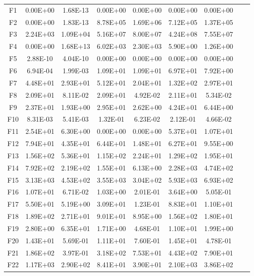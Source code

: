 \begin{table*}[htbp]
\begin{tabular}{|c|cc|cc|cc|cc|}
    \cline{1-7}
    F1    & 0.00E+00 & 1.68E-13 & 0.00E+00 & 0.00E+00 & 0.00E+00 & 0.00E+00 \\
    F2    & 0.00E+00 & 1.83E-13 & 8.78E+05 & 1.69E+06 & 7.12E+05 & 1.37E+05 \\
    F3    & 2.24E+03 & 1.09E+04 & 5.16E+07 & 8.00E+07 & 4.24E+08 & 7.55E+07 \\
    F4    & 0.00E+00 & 1.68E+13 & 6.02E+03 & 2.30E+03 & 5.90E+00 & 1.26E+00 \\
    F5    & 2.88E-10 & 4.04E-10 & 0.00E+00 & 0.00E+00 & 0.00E+00 & 0.00E+00 \\
    \cline{1-7}
    F6    & 6.94E-04 & 1.99E-03 & 1.09E+01 & 1.09E+01 & 6.97E+01 & 7.92E+00 \\
    F7    & 4.48E+01 & 2.93E+01 & 5.12E+01 & 2.04E+01 & 1.32E+02 & 2.97E+01 \\
    F8    & 2.09E+01 & 8.11E-02 & 2.09E+01 & 4.92E-02 & 2.11E+01 & 5.34E-02 \\
    F9    & 2.37E+01 & 1.93E+00 & 2.95E+01 & 2.62E+00 & 4.24E+01 & 6.44E+00 \\
    F10   & 8.31E-03 & 5.41E-03 & 1.32E-01 & 6.23E-02 & 2.12E-01 & 4.66E-02 \\
    F11   & 2.54E+01 & 6.30E+00 & 0.00E+00 & 0.00E+00 & 5.37E+01 & 1.07E+01 \\
    F12   & 7.94E+01 & 4.35E+01 & 6.44E+01 & 1.48E+01 & 6.27E+01 & 9.55E+00 \\
    F13   & 1.56E+02 & 5.36E+01 & 1.15E+02 & 2.24E+01 & 1.29E+02 & 1.95E+01 \\
    F14   & 7.92E+02 & 2.19E+02 & 1.55E+01 & 6.13E+00 & 2.28E+03 & 4.74E+02 \\
    F15   & 3.13E+03 & 4.53E+02 & 3.55E+03 & 3.04E+02 & 5.93E+03 & 6.93E+02 \\
    F16   & 1.07E+01 & 6.71E-02 & 1.03E+00 & 2.01E-01 & 3.64E+00 & 5.05E-01 \\
    F17   & 5.50E+01 & 5.19E+00 & 3.09E+01 & 1.23E-01 & 8.83E+01 & 1.10E+01 \\
    F18   & 1.89E+02 & 2.71E+01 & 9.01E+01 & 8.95E+00 & 1.56E+02 & 1.80E+01 \\
    F19   & 2.80E+00 & 6.35E+01 & 1.71E+00 & 4.68E-01 & 1.10E+01 & 1.99E+00 \\
    F20   & 1.43E+01 & 5.69E-01 & 1.11E+01 & 7.60E-01 & 1.45E+01 & 4.78E-01 \\
    \cline{1-7}
    F21   & 1.86E+02 & 3.97E-01 & 3.18E+02 & 7.53E+01 & 4.43E+02 & 7.90E+01 \\
    F22   & 1.17E+03 & 2.90E+02 & 8.41E+01 & 3.90E+01 & 2.10E+03 & 3.86E+02 \\

\end{tabular}
\end{table*}
